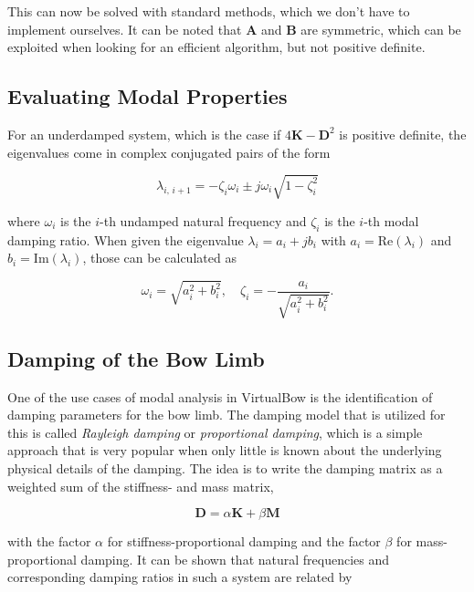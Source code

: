 This can now be solved with standard methods, which we don't have to implement ourselves.
It can be noted that $\boldsymbol{A}$ and $\boldsymbol{B}$ are symmetric, which can be exploited when looking for an efficient algorithm, but not positive definite.

\subsection{Evaluating Modal Properties}

For an underdamped system, which is the case if $4\boldsymbol{K} - \boldsymbol{D}^2$ is positive definite, the eigenvalues come in complex conjugated pairs of the form \cite{bib:li95}

\begin{equation}
\lambda_{i,\,i+1} = -\zeta_{i}\omega_{i} \pm j\omega_{i}\sqrt{1 - \zeta_{i}^2}
\end{equation}

where $\omega_{i}$ is the $i$-th undamped natural frequency and $\zeta_{i}$ is the $i$-th modal damping ratio.
When given the eigenvalue $\lambda_{i} = a_{i} + jb_{i}$ with $a_{i} = \mathrm{Re}(\lambda_i)$ and $b_{i} = \mathrm{Im}(\lambda_i)$, those can be calculated as

\begin{equation}
\omega_{i} = \sqrt{a_{i}^2 + b_{i}^2}, \quad \zeta_{i} = -\frac{a_{i}}{\sqrt{a_{i}^2 + b_{i}^2}}.
\end{equation}

\subsection{Damping of the Bow Limb}
\label{sec:rayleigh-damping}

One of the use cases of modal analysis in VirtualBow is the identification of damping parameters for the bow limb.
The damping model that is utilized for this is called \textit{Rayleigh damping} or \textit{proportional damping}, which is a simple approach that is very popular when only little is known about the underlying physical details of the damping.
The idea is to write the damping matrix as a weighted sum of the stiffness- and mass matrix,

\begin{equation}
\boldsymbol{D} = \alpha\boldsymbol{K} + \beta\boldsymbol{M}
\end{equation}

with the factor $\alpha$ for stiffness-proportional damping and the factor $\beta$ for mass-proportional damping.
It can be shown \cite{bib:rayleigh-damping} that natural frequencies and corresponding damping ratios in such a system are related by 

